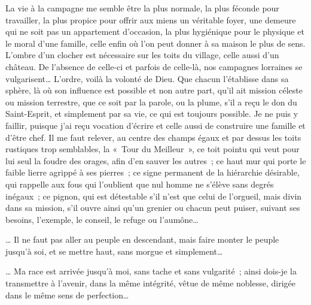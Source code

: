 \documentclass[french,twoside]{book} %
\newenvironment{quoteblock}%
  {\begin{quoting}}
  {\end{quoting}}
\newenvironment{quotebar}{%
    \def\FrameCommand{{\color{rubric!10!}\vrule width 0.5em} \hspace{0.9em}}%
    \def\OuterFrameSep{\itemsep} %
    \MakeFramed {\advance\hsize-\width \FrameRestore}
  }%
  {%
    \endMakeFramed
  }
\renewenvironment{quoteblock}%
  {%
    \savenotes
    \setstretch{0.9}
    \normalfont
    \begin{quotebar}
  }
  {%
    \end{quotebar}
    \spewnotes
  }
\begin{document}
\begin{quoteblock}
 \noindent La vie à la campagne me semble être la plus normale, la plus féconde pour travailler, la plus propice pour offrir aux miens un véritable foyer, une demeure qui ne soit pas un appartement d’occasion, la plus hygiénique pour le physique et le moral d’une famille, celle enfin où l’on peut donner à sa maison le plus de sens. L’ombre d’un clocher est nécessaire sur les toits du village, celle aussi d’un château. De l’absence de celle-ci et parfois de celle-là, nos campagnes lorraines se vulgarisent… L’ordre, voilà la volonté de Dieu. Que chacun l’établisse dans sa sphère, là où son influence est possible et non autre part, qu’il ait mission céleste ou mission terrestre, que ce soit par la parole, ou la plume, s’il a reçu le don du Saint-Esprit, et simplement par sa vie, ce qui est toujours possible. Je ne puis y faillir, puisque j’ai reçu vocation d’écrire et celle aussi de construire une famille et d’être chef. Il me faut relever, au centre des champs égaux et par dessus les toits rustiques trop semblables, la « Tour du Meilleur », ce toit pointu qui veut pour lui seul la foudre des orages, afin d’en sauver les autres ; ce haut mur qui porte le faible lierre agrippé à ses pierres ; ce signe permanent de la hiérarchie désirable, qui rappelle aux fous qui l’oublient que nul homme ne s’élève sans degrés inégaux ; ce pignon, qui est détestable s’il n’est que celui de l’orgueil, mais divin dans sa mission, s’il ouvre ainsi qu’un grenier ou chacun peut puiser, suivant ses besoins, l’exemple, le conseil, le refuge ou l’aumône…‌\par
 … Il ne faut pas aller au peuple en descendant, mais faire monter le peuple jusqu’à soi, et se mettre haut, sans morgue et simplement…‌\par
 … Ma race est arrivée jusqu’à moi, sans tache et sans vulgarité ; ainsi dois-je la transmettre à l’avenir, dans la même intégrité, vêtue de même noblesse, dirigée dans le même sens de perfection…‌
 \end{quoteblock}
\end{document}
